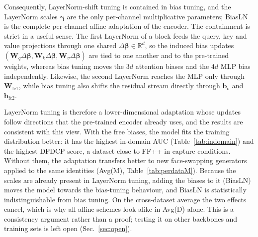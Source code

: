 \documentclass[fonts]{icst}
\begin{document}
Consequently, LayerNorm-shift tuning is contained in bias tuning, and the LayerNorm scales $\boldsymbol{\gamma}$ are the only per-channel multiplicative parameters; BiasLN is the complete per-channel affine adaptation of the encoder. The containment is strict in a useful sense. The first LayerNorm of a block feeds the query, key and value projections through one shared $\Delta\boldsymbol{\beta}\in\mathbb{R}^{d}$, so the induced bias updates $(\mathbf{W}_q\Delta\boldsymbol{\beta},\mathbf{W}_k\Delta\boldsymbol{\beta},\mathbf{W}_v\Delta\boldsymbol{\beta})$ are tied to one another and to the pre-trained weights, whereas bias tuning moves the $3d$ attention biases and the $4d$ MLP bias independently. Likewise, the second LayerNorm reaches the MLP only through $\mathbf{W}_{\mathrm{fc1}}$, while bias tuning also shifts the residual stream directly through $\mathbf{b}_o$ and $\mathbf{b}_{\mathrm{fc2}}$.

LayerNorm tuning is therefore a lower-dimensional adaptation whose updates follow directions that the pre-trained encoder already uses, and the results are consistent with this view. With the free biases, the model fits the training distribution better: it has the highest in-domain AUC (Table~\ref{tab:indomain}) and the highest DFDCP score, a dataset close to FF++ in capture conditions. Without them, the adaptation transfers better to new face-swapping generators applied to the same identities (Avg(M), Table~\ref{tab:perdataM}). Because the scales are already present in LayerNorm tuning, adding the biases to it (BiasLN) moves the model towards the bias-tuning behaviour, and BiasLN is statistically indistinguishable from bias tuning. On the cross-dataset average the two effects cancel, which is why all affine schemes look alike in Avg(D) alone. This is a consistency argument rather than a proof; testing it on other backbones and training sets is left open (Sec.~\ref{sec:open}).

\end{document}
